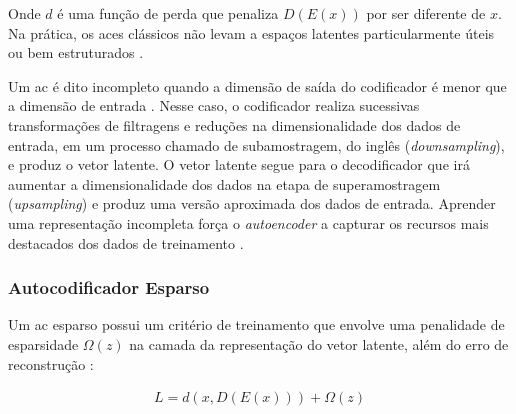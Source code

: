 Onde $d$ é uma função de perda que penaliza $D(E(x))$  por ser diferente de $x$. Na prática, os \acrshort{ac}es clássicos não levam a espaços latentes particularmente úteis ou bem estruturados \cite{FrancoisDeepLearning}. 



Um \acrshort{ac} é dito incompleto quando a dimensão de saída do codificador é menor que a dimensão de entrada \cite{Goodfellow2016}. Nesse caso, o codificador realiza sucessivas transformações de filtragens e reduções na dimensionalidade dos dados de entrada, em um processo chamado de subamostragem, do inglês (\textit{downsampling}), e produz o vetor latente. O vetor latente segue para o decodificador que irá aumentar a dimensionalidade dos dados na etapa de superamostragem (\textit{upsampling}) e produz uma versão aproximada dos dados de entrada. Aprender uma representação incompleta força o \textit{autoencoder}  a capturar os recursos mais destacados dos dados de treinamento \cite{Goodfellow2016}. 








\subsubsection{Autocodificador Esparso}

Um \acrshort{ac} esparso possui um critério de treinamento que envolve uma penalidade de esparsidade $\Omega(z)$ na camada da representação do vetor latente, além do erro de reconstrução \cite{Goodfellow2016}:

\begin{equation}
\label{eq:loss_sparse}
\begin{aligned}
L = d(x,D(E(x))) + \Omega(z) 
\end{aligned}
\end{equation}

